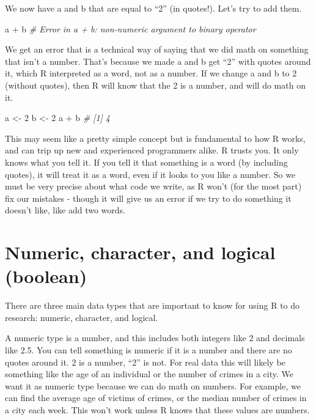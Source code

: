 \documentclass[
  a4paper,
]{krantz}
\makeatletter
\newenvironment{Shaded}{\begin{snugshade}}{\end{snugshade}}
\newcommand{\CommentTok}[1]{\textcolor[rgb]{0.56,0.35,0.01}{\textit{#1}}}
\newcommand{\DecValTok}[1]{\textcolor[rgb]{0.00,0.00,0.81}{#1}}
\newcommand{\NormalTok}[1]{#1}
\newcommand{\OtherTok}[1]{\textcolor[rgb]{0.56,0.35,0.01}{#1}}
\newcommand{\SpecialCharTok}[1]{\textcolor[rgb]{0.00,0.00,0.00}{#1}}
\newenvironment{kframe}{%
\medskip{}
\setlength{\fboxsep}{.8em}
 \def\at@end@of@kframe{}%
 \ifinner\ifhmode%
  \def\at@end@of@kframe{\end{minipage}}%
  \begin{minipage}{\columnwidth}%
 \fi\fi%
 \def\FrameCommand##1{\hskip\@totalleftmargin \hskip-\fboxsep
 \colorbox{shadecolor}{##1}\hskip-\fboxsep
     \hskip-\linewidth \hskip-\@totalleftmargin \hskip\columnwidth}%
 \MakeFramed {\advance\hsize-\width
   \@totalleftmargin\z@ \linewidth\hsize
   \@setminipage}}%
 {\par\unskip\endMakeFramed%
 \at@end@of@kframe}
\renewenvironment{Shaded}{\begin{kframe}}{\end{kframe}}
\makeatother
\begin{document}
We now have a and b that are equal to ``2'' (in quotes!).
Let's try to add them.

\begin{Shaded}
\begin{Highlighting}[]
\NormalTok{a }\SpecialCharTok{+}\NormalTok{ b}
\CommentTok{\# Error in a + b: non{-}numeric argument to binary operator}
\end{Highlighting}
\end{Shaded}

We get an error that is a technical way of saying that we
did math on something that isn't a number. That's because we
made a and b get ``2'' with quotes around it, which R
interpreted as a word, not as a number. If we change a and b
to 2 (without quotes), then R will know that the 2 is a
number, and will do math on it.

\begin{Shaded}
\begin{Highlighting}[]
\NormalTok{a }\OtherTok{\textless{}{-}} \DecValTok{2}
\NormalTok{b }\OtherTok{\textless{}{-}} \DecValTok{2}
\NormalTok{a }\SpecialCharTok{+}\NormalTok{ b}
\CommentTok{\# [1] 4}
\end{Highlighting}
\end{Shaded}

This may seem like a pretty simple concept but is
fundamental to how R works, and can trip up new and
experienced programmers alike. R trusts you. It only knows
what you tell it. If you tell it that something is a word
(by including quotes), it will treat it as a word, even if
it looks to you like a number. So we must be very precise
about what code we write, as R won't (for the most part) fix
our mistakes - though it will give us an error if we try to
do something it doesn't like, like add two words.

\hypertarget{numeric-character-and-logical-boolean}{%
\section{Numeric, character, and logical
(boolean)}\label{numeric-character-and-logical-boolean}}

There are three main data types that are important to know
for using R to do research: numeric, character, and logical.

A numeric type is a number, and this includes both integers
like 2 and decimals like 2.5. You can tell something is
numeric if it is a number and there are no quotes around it.
2 is a number, ``2'' is not. For real data this will likely
be something like the age of an individual or the number of
crimes in a city. We want it as numeric type because we can
do math on numbers. For example, we can find the average age
of victims of crimes, or the median number of crimes in a
city each week. This won't work unless R knows that these
values are numbers.
\end{document}
